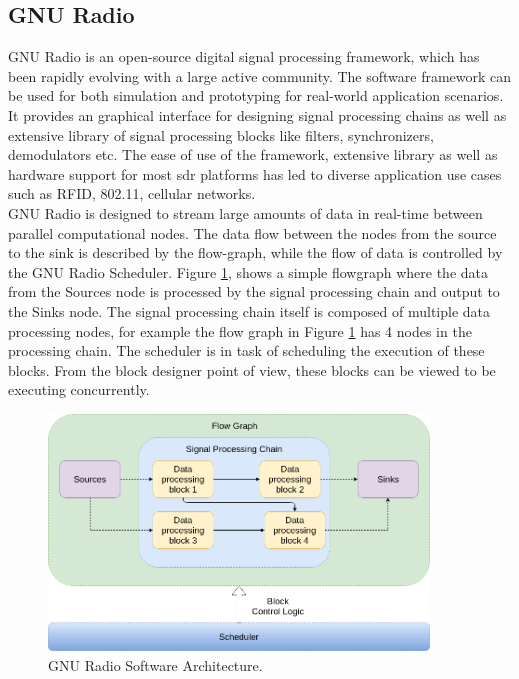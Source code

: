 \subsection{GNU Radio}

GNU Radio is an open-source digital signal processing framework, which has been rapidly evolving with a large active community.
The software framework can be used for both simulation and prototyping for real-world application scenarios. 
It  provides an graphical interface for designing signal processing chains  as well as extensive library of signal processing blocks like filters, synchronizers, demodulators etc.
The ease of use of the framework, extensive library as well as hardware support for most \ac{sdr} platforms has led to diverse application use cases such as RFID, 802.11, cellular networks.\\


GNU Radio is designed to stream large amounts of data in real-time between parallel computational nodes.
The data flow between the nodes from the source to the sink is described by the flow-graph, while the flow of data is controlled by the GNU Radio Scheduler.
Figure \ref{gnuradio_arch}, shows a simple flowgraph where the data from the Sources node is processed by the signal processing chain and output to the Sinks node.
The signal processing chain itself is composed of multiple data processing nodes, for example the flow graph in Figure \ref{gnuradio_arch} has 4 nodes in the processing chain.
The scheduler is in task of scheduling the execution of these blocks. 
From the block designer point of view, these blocks can be viewed to be executing concurrently.

\begin{figure}[h!]
\centering
\includegraphics[width=0.9\textwidth]{Figure/GNURADIO_1.png}
\caption{GNU Radio Software Architecture.}
\label{gnuradio_arch}
\end{figure}

